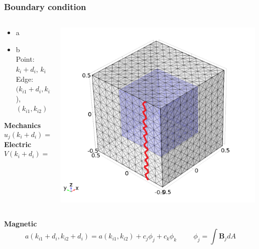 \documentclass[compress]{beamer}
\begin{document}
\begin{frame}\frametitle{Boundary condition}
\begin{columns}[totalwidth=\textwidth]
   \begin{column}{.50\textwidth}
   \begin{itemize}[label=$\bullet$, font=\small, leftmargin=*]
	\item a
	\item b \\
	Point: $k_i + d_i$, $k_i$ \\
	Edge: $(k_{i1}+d_i,k_{i2}+d_i$), $(k_{i1},k_{i2})$
	\end{itemize}
\textbf{Mechanics}
\begin{equation*}
u_j(k_i+d_i) = u_j(k_i)+\bar{S}_{ij}d_i
\end{equation*}
\textbf{Electric}
\begin{equation*}
V(k_i+d_i) = V(k_i)+\bar{E}_{i}d_i
\end{equation*}
   \end{column}
   \begin{column}{.49\textwidth}
   \includegraphics[width=0.99\textwidth]{Graphic/04_meshperiocondi.pdf}
   \end{column}
\end{columns}
\textbf{Magnetic}
\begin{equation*}
a(k_{i1}+d_i,k_{i2}+d_i) = a(k_{i1},k_{i2})+ c_j \phi_j + c_k\phi_k \hspace{1cm} \phi_j = \int \boldsymbol{B}_jdA

\end{equation*}
\end{frame}
\end{document}

